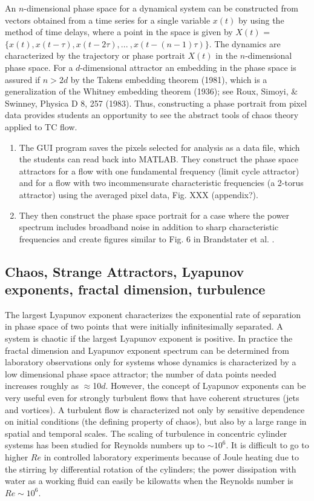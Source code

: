 \documentclass[%
 amsmath,amssymb,
 aps,
floatfix,
aps,prd,longbibliography,
notitlepage
]{revtex4-1}
\begin{document}
An $n$-dimensional phase space for a dynamical system can be constructed from vectors obtained from a time series for a single variable $x(t)$ by using the method of time delays, where a point in the space is given by $X(t)$ = $\{x(t), x(t-\tau), x(t-2\tau), . . .  \ , x(t-(n-1)\tau)\}$. The dynamics are characterized by the trajectory or phase portrait $X(t)$ in the $n$-dimensional phase space.  For a $d$-dimensional attractor an embedding in the phase space is assured if $n > 2d$ by the Takens embedding theorem (1981), which is a generalization of the Whitney embedding theorem (1936); see Roux, Simoyi, $\&$ Swinney, Physica D 8, 257 (1983). Thus, constructing a phase portrait from pixel data provides students an opportunity to see the abstract tools of chaos theory applied to TC flow.

\begin{enumerate}
\item The GUI program saves the pixels selected for analysis as a data file, which the students can read back into MATLAB. They construct the phase space attractors for a flow with one fundamental frequency (limit cycle attractor) and for a flow with two incommensurate characteristic frequencies (a 2-torus attractor) using the averaged pixel data, Fig. XXX (appendix?).
\item They then construct the phase space portrait for a case where the power spectrum includes broadband noise in addition to sharp characteristic frequencies and create figures similar to Fig. 6 in Brandstater et al. \cite{brandstater_et_al_1987}.
\end{enumerate}

\subsection{Chaos, Strange Attractors, Lyapunov exponents, fractal dimension, turbulence}

The largest Lyapunov exponent characterizes the exponential rate of separation in phase space of two points that were initially infinitesimally separated.  A system is chaotic if the largest Lyapunov exponent is positive.  In practice the fractal dimension and Lyapunov exponent spectrum can be determined from laboratory observations only for systems whose dynamics is characterized by a low dimensional phase space attractor; the number of data points needed increases roughly as $\approx$10$d$.  However, the concept of Lyapunov exponents can be very useful even for strongly turbulent flows that have coherent structures (jets and vortices). A turbulent flow is characterized not only by sensitive dependence on initial conditions (the defining property of chaos), but also by a large range in spatial and temporal scales. The scaling of turbulence in concentric cylinder systems has been studied for Reynolds numbers up to $\sim10^6$.   It is difficult to go to higher $Re$ in controlled laboratory experiments because of Joule heating due to the stirring by differential rotation of the cylinders; the power dissipation with water as a working fluid can easily be kilowatts when the Reynolds number is $Re\sim10^6$.
\end{document}
